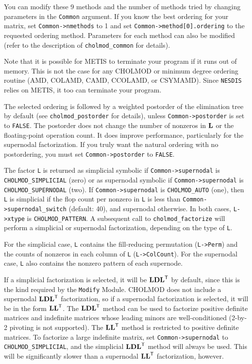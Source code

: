 \documentclass[11pt]{article}
\newcommand{\m}[1]{{\bf{#1}}}       %
\newcommand{\tr}{^{\sf T}}          %
\begin{document}
You can modify these 9 methods and the number of methods tried by changing
parameters in the {\tt Common} argument.  If you know the best ordering for your
matrix, set {\tt Common->nmethods} to 1 and set {\tt Common->method[0].ordering} to the
requested ordering method.  Parameters for each method can also be modified
(refer to the description of {\tt cholmod\_common} for details).

Note that it is possible for METIS to terminate your program if it runs out
of memory.  This is not the case for any CHOLMOD or minimum degree ordering
routine (AMD, COLAMD, CAMD, CCOLAMD, or CSYMAMD).
Since {\tt NESDIS} relies on METIS, it too can terminate your program.

The selected ordering is followed by a weighted postorder of the elimination
tree by default (see {\tt cholmod\_postorder} for details),
unless {\tt Common->postorder} is set to {\tt FALSE}.
The postorder does not change the number of nonzeros in $\m{L}$ or
the floating-point operation count.  It does improve performance,
particularly for the supernodal factorization.
If you truly want the natural ordering with no postordering,
you must set {\tt Common->postorder} to {\tt FALSE}.

The factor {\tt L} is returned as simplicial symbolic if
{\tt Common->supernodal} is {\tt CHOLMOD\_SIMPLICIAL} (zero) or as supernodal symbolic if
{\tt Common->supernodal} is {\tt CHOLMOD\_SUPERNODAL} (two).  If \newline
{\tt Common->supernodal} is {\tt CHOLMOD\_AUTO} (one),
then {\tt L} is simplicial if the flop count per nonzero in {\tt L} is less than
{\tt Common->supernodal\_switch} (default: 40), and
supernodal otherwise.  In both cases, {\tt L->xtype} is {\tt CHOLMOD\_PATTERN}.
A subsequent call to {\tt cholmod\_factorize} will perform a
simplicial or supernodal factorization, depending on the type of {\tt L}.

For the simplicial case, {\tt L} contains the fill-reducing permutation ({\tt L->Perm})
and the counts of nonzeros in each column of {\tt L} ({\tt L->ColCount}).  For the
supernodal case, {\tt L} also contains the nonzero pattern of each supernode.

If a simplicial factorization is selected, it will be $\m{LDL}\tr$ by default, since
this is the kind required by the {\tt Modify} Module.  CHOLMOD does not include a
supernodal $\m{LDL}\tr$ factorization, so if a supernodal factorization is selected,
it will be in the form $\m{LL}\tr$.  The $\m{LDL}\tr$ method can be used to
factorize positive definite matrices and indefinite matrices whose leading minors
are well-conditioned (2-by-2 pivoting is not supported).  The $\m{LL}\tr$ method
is restricted to positive definite matrices.  To factorize a large indefinite matrix,
set {\tt Common->supernodal} to {\tt CHOLMOD\_SIMPLICIAL}, and the simplicial 
$\m{LDL}\tr$ method will always be used.  This will be significantly slower than
a supernodal $\m{LL}\tr$ factorization, however.
\end{document}
